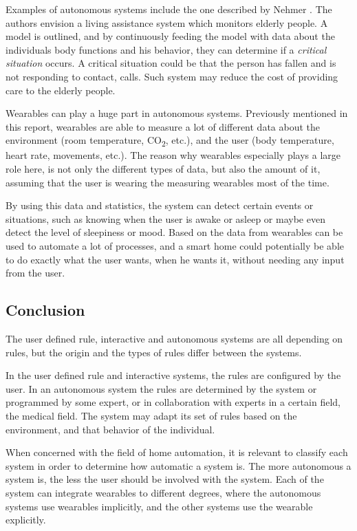 Examples of autonomous systems include the one described by Nehmer \etal \cite{nehmer2006living}. 
The authors envision a living assistance system which monitors elderly people. 
A model is outlined, 
and by continuously feeding the model with data about the individuals body functions and his behavior, 
they can determine if a \emph{critical situation} occurs. 
A critical situation could be that the person has fallen and is not responding to contact, \eg calls.
Such system may reduce the cost of providing care to the elderly people.

Wearables can play a huge part in autonomous systems. 
Previously mentioned in this report, 
wearables are able to measure a lot of different data about the environment (room temperature, CO\textsubscript{2}, etc.), 
and the user (body temperature, heart rate, movements, etc.). 
The reason why wearables especially plays a large role here, 
is not only the different types of data, but also the amount of it,
assuming that the user is wearing the measuring wearables most of the time. 

By using this data and statistics, the system can detect certain events or situations, 
such as knowing when the user is awake or asleep or maybe even detect the level of sleepiness or mood.    
Based on the data from wearables can be used to automate a lot of processes, 
and a smart home could potentially be able to do exactly what the user wants, 
when he wants it, without needing any input from the user. 

\subsection{Conclusion}

The user defined rule, interactive and autonomous systems are all depending on rules, 
but the origin and the types of rules differ between the systems. 

In the user defined rule and interactive systems, the rules are configured by the user.
In an autonomous system the rules are determined by the system or programmed by some expert, 
or in collaboration with experts in a certain field, \eg the medical field. 
The system may adapt its set of rules based on the environment, 
and that behavior of the individual.

When concerned with the field of home automation, 
it is relevant to classify each system in order to determine how automatic a system is. 
The more autonomous a system is, 
the less the user should be involved with the system.
Each of the system can integrate wearables to different degrees, 
where the autonomous systems use wearables implicitly, 
and the other systems use the wearable explicitly.  

